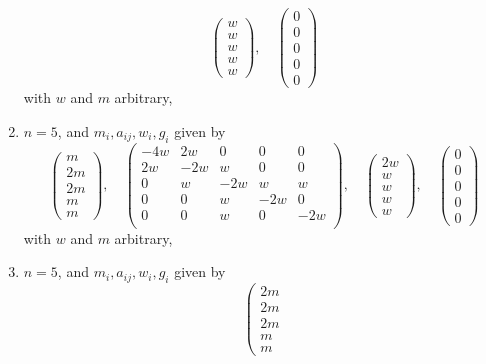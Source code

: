 \begin{lemma}
\begin{enumerate}
$$\left(
\begin{matrix}
w \\
w \\
w \\
w \\
w
\end{matrix}
\right),
\quad
\left(
\begin{matrix}
0 \\
0 \\
0 \\
0 \\
0
\end{matrix}
\right)
$$
with $w$ and $m$ arbitrary,
\item
\label{item-triple-extended-up}
$n = 5$, and $m_i, a_{ij}, w_i, g_i$ given by
$$
\left(
\begin{matrix}
m \\
2m \\
2m \\
m \\
m
\end{matrix}
\right),
\quad
\left(
\begin{matrix}
-4w & 2w & 0 & 0 & 0 \\
2w & -2w & w & 0 & 0 \\
0 & w & -2w & w & w \\
0 & 0 & w & -2w & 0 \\
0 & 0 & w & 0 & -2w \\
\end{matrix}
\right),
\quad
\left(
\begin{matrix}
2w \\
w \\
w \\
w \\
w
\end{matrix}
\right),
\quad
\left(
\begin{matrix}
0 \\
0 \\
0 \\
0 \\
0
\end{matrix}
\right)
$$
with $w$ and $m$ arbitrary,
\item
\label{item-triple-extended-down}
$n = 5$, and $m_i, a_{ij}, w_i, g_i$ given by
$$
\left(
\begin{matrix}
2m \\
2m \\
2m \\
m \\
m
\end{matrix}
$$
\end{enumerate}
\end{lemma}
